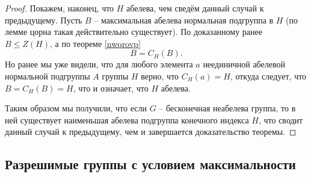 \documentclass{article}
\begin{document}
\begin{proof}
    Покажем, наконец, что $H$ абелева, чем сведём данный случай к предыдущему. Пусть $B$ -- максимальная абелева нормальная подгруппа в $H$ (по лемме цорна такая действительно существует). По доказанному ранее $B \leqslant Z(H)$, а по теореме \ref{nwqrovp} $$ B = C_H(B). $$
    Но ранее мы уже видели, что для любого элемента $a$ неединичной абелевой нормальной подгруппы $A$ группы $H$ верно, что $C_H(a) = H$, откуда следует, что $B = C_H(B) = H$, что и означает, что $H$ абелева.

    Таким образом мы получили, что если $G$ -- бесконечная неабелева группа, то в ней существует наименьшая абелева подгруппа конечного индекса $H$, что сводит данный случай к предыдущему, чем и завершается доказательство теоремы.
\end{proof}

\subsection{Разрешимые группы с условием максимальности}
\end{document}
